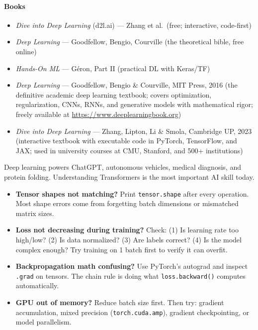 \documentclass[11pt, a4paper, oneside]{report}
\begin{document}
\paragraph{Books}
\begin{itemize}[leftmargin=*]
\item \emph{Dive into Deep Learning} (d2l.ai) --- Zhang et al.\ (free; interactive, code-first)
\item \emph{Deep Learning} --- Goodfellow, Bengio, Courville (the theoretical bible, free online)
\item \emph{Hands-On ML} --- G\'{e}ron, Part II (practical DL with Keras/TF)

\item \emph{Deep Learning} --- Goodfellow, Bengio \& Courville, MIT Press, 2016 (the definitive academic deep learning textbook; covers optimization, regularization, CNNs, RNNs, and generative models with mathematical rigor; freely available at \url{https://www.deeplearningbook.org})
\item \emph{Dive into Deep Learning} --- Zhang, Lipton, Li \& Smola, Cambridge UP, 2023 (interactive textbook with executable code in PyTorch, TensorFlow, and JAX; used in university courses at CMU, Stanford, and 500+ institutions)
\end{itemize}


\begin{realworldbox}
Deep learning powers ChatGPT, autonomous vehicles, medical diagnosis, and protein folding. Understanding Transformers is the most important AI skill today.
\end{realworldbox}


\begin{stuckbox}
\begin{itemize}[leftmargin=*]
\item \textbf{Tensor shapes not matching?} Print \texttt{tensor.shape} after every operation. Most shape errors come from forgetting batch dimensions or mismatched matrix sizes.
\item \textbf{Loss not decreasing during training?} Check: (1) Is learning rate too high/low? (2) Is data normalized? (3) Are labels correct? (4) Is the model complex enough? Try training on 1 batch first to verify it can overfit.
\item \textbf{Backpropagation math confusing?} Use PyTorch's autograd and inspect \texttt{.grad} on tensors. The chain rule is doing what \texttt{loss.backward()} computes automatically.
\item \textbf{GPU out of memory?} Reduce batch size first. Then try: gradient accumulation, mixed precision (\texttt{torch.cuda.amp}), gradient checkpointing, or model parallelism.
\end{itemize}
\end{stuckbox}
\end{document}
